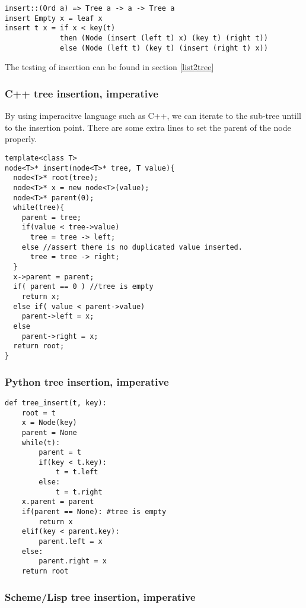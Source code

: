 \documentclass{article}
\begin{document}
\begin{lstlisting}
insert::(Ord a) => Tree a -> a -> Tree a
insert Empty x = leaf x
insert t x = if x < key(t) 
             then (Node (insert (left t) x) (key t) (right t))
             else (Node (left t) (key t) (insert (right t) x))
\end{lstlisting}

The testing of insertion can be found in section \ref{list2tree}

\subsubsection*{C++ tree insertion, imperative}

By using imperacitve language such as C++, we can iterate to the sub-tree untill
to the insertion point. There are some extra lines to set the parent of the node
properly.

\lstset{language=C++}
\begin{lstlisting}
template<class T>
node<T>* insert(node<T>* tree, T value){
  node<T>* root(tree);
  node<T>* x = new node<T>(value);
  node<T>* parent(0);
  while(tree){
    parent = tree;
    if(value < tree->value)
      tree = tree -> left;
    else //assert there is no duplicated value inserted.
      tree = tree -> right;
  }
  x->parent = parent;
  if( parent == 0 ) //tree is empty
    return x;
  else if( value < parent->value)
    parent->left = x;
  else
    parent->right = x;
  return root;
}
\end{lstlisting}

\subsubsection*{Python tree insertion, imperative}

\lstset{language=Python}
\begin{lstlisting}
def tree_insert(t, key):
    root = t
    x = Node(key)
    parent = None
    while(t):
        parent = t
        if(key < t.key):
            t = t.left
        else:
            t = t.right
    x.parent = parent
    if(parent == None): #tree is empty
        return x
    elif(key < parent.key):
        parent.left = x
    else:
        parent.right = x
    return root
\end{lstlisting}

\subsubsection*{Scheme/Lisp tree insertion, imperative}
\end{document}
